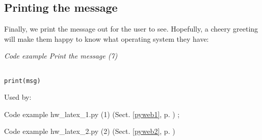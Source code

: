 \documentclass{article}
\begin{document}
\subsection{Printing the message}

Finally, we print the message out for the user to see.  Hopefully, a
cheery greeting will make them happy to know what operating system
they have:

\label{pyweb7}
    \begin{flushleft}
    \textit{Code example Print the message (7)}
    \begin{Verbatim}[commandchars=\\\{\},codes={\catcode`$=3\catcode`^=7},frame=single]

print(msg)

\end{Verbatim}

    \footnotesize
    Used by:
    \begin{list}{}{}
    
    \item Code example hw_latex_1.py (1) (Sect. \ref{pyweb1}, p. \pageref{pyweb1})
; 
    \item Code example hw_latex_2.py (2) (Sect. \ref{pyweb2}, p. \pageref{pyweb2})

    \end{list}
    \normalsize
\end{flushleft}
\end{document}
